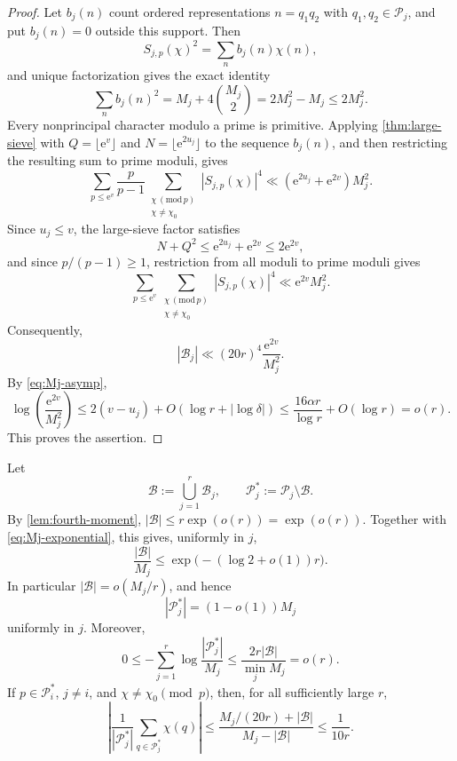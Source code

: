 \documentclass[11pt]{amsart}
\theoremstyle{definition}
\theoremstyle{remark}
\numberwithin{equation}{section}
\newcommand{\e}{\mathrm e}
\newcommand{\Pcal}{\mathcal P}
\newcommand{\Bcal}{\mathcal B}
\begin{document}
\begin{proof}
Let $b_j(n)$ count ordered representations $n=q_1q_2$ with
$q_1,q_2\in\Pcal_j$, and put $b_j(n)=0$ outside this support.  Then
\[
 S_{j,p}(\chi)^2=\sum_n b_j(n)\chi(n),
\]
and unique factorization gives the exact identity
\[
 \sum_n b_j(n)^2=M_j+4\binom{M_j}{2}=2M_j^2-M_j\le2M_j^2.
\]
Every nonprincipal character modulo a prime is primitive.  Applying \cref{thm:large-sieve} with $Q=\lfloor\e^v\rfloor$ and $N=\lfloor\e^{2u_j}\rfloor$ to the sequence $b_j(n)$, and then restricting the resulting sum to prime moduli, gives
\[
 \sum_{p\le\e^v}\frac p{p-1}
 \sum_{\substack{\chi\, (\mathrm{mod}\,p)\\ \chi\ne\chi_0}}
 |S_{j,p}(\chi)|^4
 \ll (\e^{2u_j}+\e^{2v})M_j^2.
\]
Since $u_j\le v$, the large-sieve factor satisfies
\[
 N+Q^2\le \e^{2u_j}+\e^{2v}\le2\e^{2v},
\]
and since $p/(p-1)\ge1$, restriction from all moduli to prime moduli gives
\[
 \sum_{p\le\e^v}\sum_{\substack{\chi\, (\mathrm{mod}\,p)\\ \chi\ne\chi_0}}
 |S_{j,p}(\chi)|^4
 \ll \e^{2v}M_j^2.
\]
Consequently,
\[
 |\Bcal_j|
 \ll (20r)^4\frac{\e^{2v}}{M_j^2}.
\]
By \eqref{eq:Mj-asymp},
\[
 \log\left(\frac{\e^{2v}}{M_j^2}\right)
 \le2(v-u_j)+O(\log r+|\log\delta|)
 \le\frac{16\alpha r}{\log r}+O(\log r)=o(r).
\]
This proves the assertion.
\end{proof}

Let
\[
 \Bcal:=\bigcup_{j=1}^r\Bcal_j,
 \qquad
 \Pcal_j^*:=\Pcal_j\setminus\Bcal.
\]
By \cref{lem:fourth-moment}, $|\Bcal|\le r\exp(o(r))=\exp(o(r))$.
Together with \eqref{eq:Mj-exponential}, this gives, uniformly in $j$,
\begin{equation}\label{eq:bad-set-ratio}
 \frac{|\Bcal|}{M_j}
 \le\exp\bigl(-(\log 2+o(1))r\bigr).
\end{equation}
In particular $|\Bcal|=o(M_j/r)$, and hence
\begin{equation}\label{eq:clean-size}
 |\Pcal_j^*|=(1-o(1))M_j
\end{equation}
uniformly in $j$.  Moreover,
\[
 0\le-\sum_{j=1}^r\log\frac{|\Pcal_j^*|}{M_j}
 \le \frac{2r|\Bcal|}{\min_j M_j}=o(r).
\]
If $p\in\Pcal_i^*$, $j\ne i$, and $\chi\ne\chi_0\pmod p$, then, for
all sufficiently large $r$,
\begin{equation}\label{eq:clean-fourier}
 \left|
 \frac1{|\Pcal_j^*|}\sum_{q\in\Pcal_j^*}\chi(q)
 \right|
 \le
 \frac{M_j/(20r)+|\Bcal|}{M_j-|\Bcal|}
 \le\frac1{10r}.
\end{equation}
\end{document}
